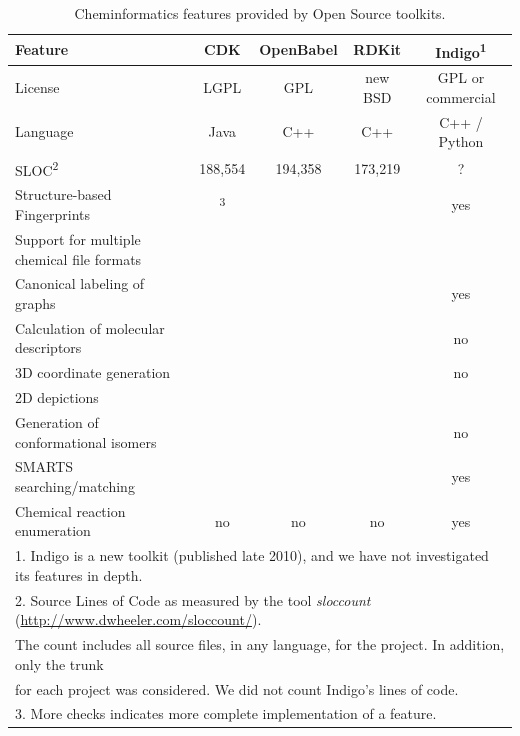 \documentclass{sig-alternate}
\newcommand{\none}{\ding{55}}
\newcommand{\least}{\ding{51}}
\newcommand{\little}{\ding{51}\ding{51}}
\newcommand{\lots}{\ding{51}\ding{51}\ding{51}}
\begin{document}
%
\begin{table}
  \centering
  \begin{tabular}{lcccc}  \hline
    \textbf{Feature} & \textbf{CDK} & \textbf{OpenBabel} &
    \textbf{RDKit} & \textbf{Indigo}\textsuperscript{1} \tabularnewline \hline
    License & LGPL & GPL & new BSD & GPL or commercial \tabularnewline
    Language & Java & C++ & C++ & C++ / Python \tabularnewline
    SLOC\textsuperscript{2} & 188,554 & 194,358 & 173,219 & ? \tabularnewline
    Structure-based Fingerprints & \lots\textsuperscript{3} & \lots & \lots & yes \tabularnewline
    Support for multiple chemical file formats & \little & \lots & \least & \little \tabularnewline
    Canonical labeling of graphs & \lots & \lots & \lots & yes \tabularnewline
    Calculation of molecular descriptors & \lots & \least & \lots & no \tabularnewline
    3D coordinate generation & \least & \lots & \lots & no \tabularnewline
    2D depictions & \lots & \little & \lots & \little \tabularnewline
    Generation of conformational isomers & \none & \least & \least & no \tabularnewline
    SMARTS searching/matching & \lots & \lots & \lots & yes \tabularnewline
    Chemical reaction enumeration & no & no & no & yes \tabularnewline
    \hline
    \multicolumn{5}{l}{1. Indigo is a new toolkit (published late 2010), and we have not investigated its features in depth.} \\
    \multicolumn{5}{l}{2. Source Lines of Code as measured by the tool \emph{sloccount} (\url{http://www.dwheeler.com/sloccount/}).} \\
    \multicolumn{5}{l}{The count includes all source files, in any language, for the
  project. In addition, only the trunk} \\
    \multicolumn{5}{l}{for each project was considered.  We did not count Indigo's lines of code.} \\
    \multicolumn{5}{l}{3. More checks indicates more complete implementation of a feature.} \\
  \end{tabular}
  \caption{Cheminformatics features provided by Open Source toolkits.}
  \label{tab:features}
\end{table}
\end{document}
